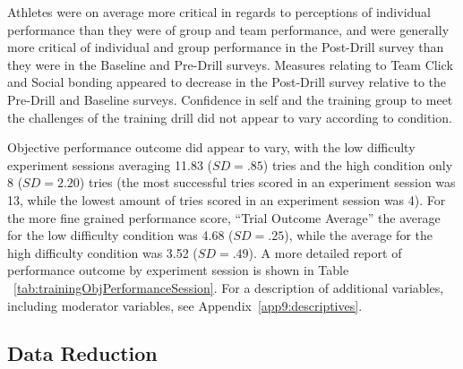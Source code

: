 Athletes were on average more critical in regards to perceptions of individual performance than they were of group and team performance, and were generally more critical of individual and group performance in the Post-Drill survey than they were in the Baseline and Pre-Drill surveys.  Measures relating to Team Click and Social bonding appeared to decrease in the Post-Drill survey relative to the Pre-Drill and Baseline surveys. Confidence in self and the training group to meet the challenges of the training drill did not appear to vary according to condition.

Objective performance outcome did appear to vary, with the low difficulty experiment sessions averaging 11.83 ($SD = .85$) tries and the high condition only 8 ($SD = 2.20$) tries (the most successful tries scored in an experiment session was 13, while the lowest amount of tries scored in an experiment session was 4).  For the more fine grained performance score, ``Trial Outcome Average'' the average for the low difficulty condition was 4.68 ($SD = .25$), while the average for the high difficulty condition was 3.52 ($SD = .49$). A more detailed report of performance outcome by experiment session is shown in Table ~\ref{tab:trainingObjPerformanceSession}.  For a description of additional variables, including moderator variables, see Appendix~\ref{app9:descriptives}.












\subsection{Data Reduction}

